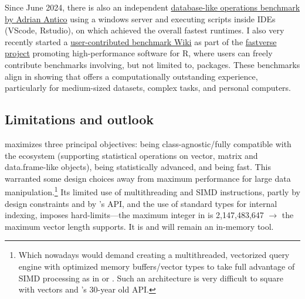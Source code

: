 \documentclass[nojss]{jss} %
\begin{document}
Since June 2024, there is also an independent \href{https://github.com/AdrianAntico/Benchmarks?tab=readme-ov-file#background}{database-like operations benchmark by Adrian Antico} using a windows server and executing scripts inside IDEs (VScode, Rstudio), on which  achieved the overall fastest runtimes. I also very recently started a \href{https://github.com/fastverse/fastverse/wiki/Benchmarks}{user-contributed benchmark Wiki} as part of the \href{https://fastverse.github.io/fastverse/}{fastverse project} promoting high-performance software for R, where users can freely contribute benchmarks involving, but not limited to,  packages. These benchmarks align in showing that  offers a computationally outstanding experience, particularly for medium-sized datasets, complex tasks, and personal computers. %

\subsection{Limitations and outlook}

 maximizes three principal objectives: being class-agnostic/fully compatible with the  ecosystem (supporting statistical operations on vector, matrix and data.frame-like objects), being statistically advanced, and being fast. This warranted some design choices away from maximum performance for large data manipulation.\footnote{Which nowadays would demand creating a multithreaded, vectorized query engine with optimized memory buffers/vector types to take full advantage of SIMD processing as in  or . Such an architecture is very difficult to square with  vectors and 's 30-year old  API.} Its limited use of multithreading and SIMD instructions, partly by design constraints and by 's  API, and the use of standard types for internal indexing, imposes hard-limits---the maximum integer in  is 2,147,483,647 $\to$ the maximum vector length  supports. It is and will remain an in-memory tool. \newline
\end{document}

